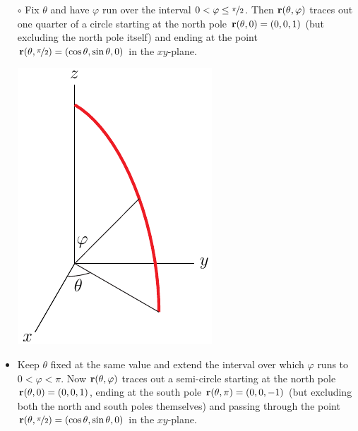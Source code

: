 \begin{eg}[Sphere]
\begin{itemize}\itemsep1pt \parskip0pt  %
\item[$\circ$]Fix $\theta$ and have $\varphi$ run over the interval 
$0<\varphi\le \nicefrac{\pi}{2}$. Then $\mathbf{r}(\theta,\varphi)$ traces out one quarter of a circle starting at the north pole $\mathbf{r}(\theta,0) = (0,0,1)$
(but excluding the north pole itself) and ending at the point
$\mathbf{r}(\theta,\nicefrac{\pi}{2}) = (\cos\theta,\sin\theta,0)$ in the $xy$-plane.
\begin{nfig}
\begin{center} 
   \includegraphics{sphericalRngA.pdf}
\end{center}
\end{nfig}

\item Keep $\theta$ fixed at the same value and extend the interval over which  
$\varphi$ runs to $0<\varphi<\pi$. Now $\mathbf{r}(\theta,\varphi)$ traces out a 
semi-circle starting at the north pole $\mathbf{r}(\theta,0) = (0,0,1)$,
ending at the south pole $\mathbf{r}(\theta,\pi) = (0,0,-1)$
(but excluding both the north and south poles themselves) and passing 
through the point
$\mathbf{r}(\theta,\nicefrac{\pi}{2}) = (\cos\theta,\sin\theta,0)$ in the $xy$-plane.


\end{itemize}
\end{eg}
